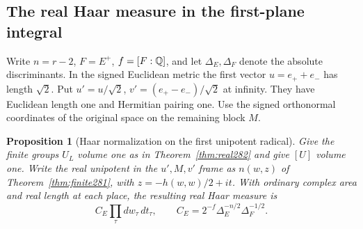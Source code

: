 \documentclass[a4paper,11pt]{article}
\newtheorem{proposition}{Proposition}[section]
\theoremstyle{definition}
\theoremstyle{remark}
\numberwithin{equation}{section}
\begin{document}
\subsection{The real Haar measure in the first-plane integral}\label{nav:VIII-49}
Write \(n=r-2\), \(F=E^+\), \(f=[F:\mathbb Q]\), and let
\(\Delta_E,\Delta_F\) denote the absolute discriminants.
In the signed Euclidean metric the first vector \(u=e_++e_-\)
has length \(\sqrt2\). Put
\(u'=u/\sqrt2\), \(v'=(e_+-e_-)/\sqrt2\) at infinity.
They have Euclidean length one and Hermitian pairing one.
Use the signed orthonormal coordinates of the original
space on the remaining block \(M\).

\begin{proposition}[Haar normalization on the first unipotent radical]\leavevmode
\label{prop:measure283}
Give the finite groups \(U_L\) volume one as in
Theorem~\ref{thm:real282} and give \([U]\) volume one. Write
the real unipotent in the \(u',M,v'\) frame as \(n(w,z)\)
of Theorem~\ref{thm:finite281}, with \(z=-h(w,w)/2+it\).
With ordinary complex area and real length at each place,
the resulting real Haar measure is
\[
 C_E\prod_{\tau}dw_\tau\,dt_\tau,\qquad
 C_E=2^{-f}\Delta_E^{-n/2}\Delta_F^{-1/2}.
\]
\end{proposition}
\end{document}
